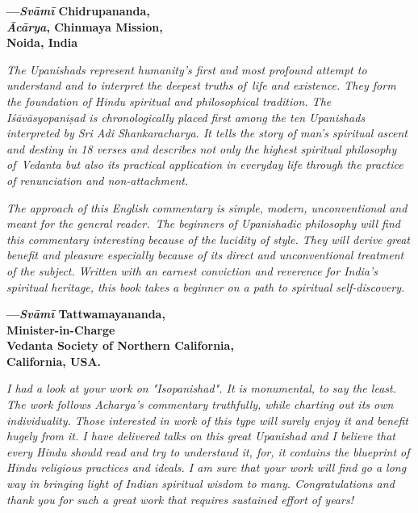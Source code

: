 \begin{flushright}
\textbf{---\emph{Svāmī} Chidrupananda,}\\
\textbf{\emph{Ācārya}, Chinmaya Mission,}\\
\textbf{Noida, India}
\end{flushright}
\medskip

\emph{The Upanishads represent humanity's first and most profound attempt to understand and to interpret the deepest truths of~life and existence. They form the foundation of Hindu spiritual and philosophical tradition. The Iśāvāsyopaniṣad is chronologically placed first among the ten Upanishads interpreted by Sri Adi Shankaracharya. It tells the story of man's spiritual ascent and destiny in 18 verses and describes not only the highest spiritual philosophy of~Vedanta but also its practical application in everyday life through the practice of renunciation and non-attachment.~}

\emph{The approach of this English commentary is simple, modern, unconventional and meant for the general reader.~The beginners of Upanishadic philosophy will find this commentary interesting because of the lucidity of style. They will derive great benefit and pleasure especially because of its direct and unconventional treatment of the subject. Written with an earnest conviction and reverence for India's spiritual heritage, this book takes a beginner on a path to spiritual self-discovery.}
\medskip

\begin{flushright}
\textbf{---\emph{Svāmī} Tattwamayananda,}\\
\textbf{Minister-in-Charge}\\
\textbf{Vedanta Society of Northern California,}\\
\textbf{California, USA.}
\end{flushright}
\medskip

\emph{I had a look at your work on "Isopanishad". It is monumental, to say the least. The work follows Acharya's commentary truthfully, while charting out its own individuality. Those interested in work of this type will surely enjoy it and benefit hugely from it. I have delivered talks on this great Upanishad and I believe that every Hindu should read and try to understand it, for, it contains the blueprint of Hindu religious practices and ideals. I am sure that your work will find go a long way in bringing light of Indian spiritual wisdom to many. Congratulations and thank you for such a great work that requires sustained effort of years!}
\medskip

